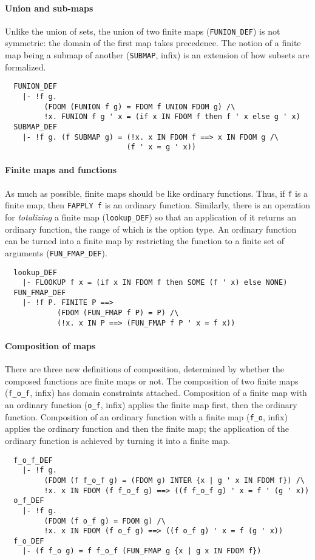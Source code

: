 \paragraph {Union and sub-maps}

Unlike the union of sets, the union of two finite maps
({\small\verb+FUNION_DEF+}) is not symmetric: the domain of the first
map takes precedence. The notion of a finite map being a submap of another
({\small\verb+SUBMAP+}, infix) is an extension of how subsets are formalized.
{\small
\begin{verbatim}
  FUNION_DEF
    |- !f g.
         (FDOM (FUNION f g) = FDOM f UNION FDOM g) /\
         !x. FUNION f g ' x = (if x IN FDOM f then f ' x else g ' x)
  SUBMAP_DEF
    |- !f g. (f SUBMAP g) = (!x. x IN FDOM f ==> x IN FDOM g /\
                            (f ' x = g ' x))
\end{verbatim}
}

\paragraph {Finite maps and functions}

As much as possible, finite maps should be like ordinary functions.
Thus, if \verb+f+ is a finite map, then {\small\verb+FAPPLY f+} is an
ordinary function. Similarly, there is an operation for
\emph{totalizing} a finite map ({\small\verb+lookup_DEF+}) so that an
application of it returns an ordinary function, the range of which is
the option type.  An ordinary function can be turned into a finite map
by restricting the function to a finite set of arguments
({\small\verb+FUN_FMAP_DEF+}).
%
{\small
\begin{verbatim}
  lookup_DEF
    |- FLOOKUP f x = (if x IN FDOM f then SOME (f ' x) else NONE)
  FUN_FMAP_DEF
    |- !f P. FINITE P ==>
            (FDOM (FUN_FMAP f P) = P) /\
            (!x. x IN P ==> (FUN_FMAP f P ' x = f x))
\end{verbatim}
}

\paragraph {Composition of maps}

There are three new definitions of composition, determined by whether
the composed functions are finite maps or not. The composition of two
finite maps (\verb+f_o_f+, infix) has domain constraints
attached. Composition of a finite map with an ordinary function
(\verb+o_f+, infix) applies the finite map first, then the ordinary
function.  Composition of an ordinary function with a finite map
(\verb+f_o+, infix) applies the ordinary function and then the finite
map; the application of the ordinary function is achieved by turning
it into a finite map.
%
{\small
\begin{verbatim}
  f_o_f_DEF
    |- !f g.
         (FDOM (f f_o_f g) = (FDOM g) INTER {x | g ' x IN FDOM f}) /\
         !x. x IN FDOM (f f_o_f g) ==> ((f f_o_f g) ' x = f ' (g ' x))
  o_f_DEF
    |- !f g.
         (FDOM (f o_f g) = FDOM g) /\
         !x. x IN FDOM (f o_f g) ==> ((f o_f g) ' x = f (g ' x))
  f_o_DEF
    |- (f f_o g) = f f_o_f (FUN_FMAP g {x | g x IN FDOM f})
\end{verbatim}
}

